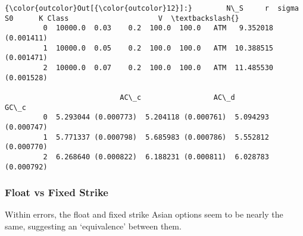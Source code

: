 \documentclass{article}
\begin{document}
            \begin{Verbatim}[commandchars=\\\{\}]
{\color{outcolor}Out[{\color{outcolor}12}]:}        N\_S     r  sigma     S0      K Class                     V  \textbackslash{}
         0  10000.0  0.03    0.2  100.0  100.0   ATM   9.352018 (0.001411)   
         1  10000.0  0.05    0.2  100.0  100.0   ATM  10.388515 (0.001471)   
         2  10000.0  0.07    0.2  100.0  100.0   ATM  11.485530 (0.001528)   
         
                           AC\_c                 AC\_d                 GC\_c  
         0  5.293044 (0.000773)  5.204118 (0.000761)  5.094293 (0.000747)  
         1  5.771337 (0.000798)  5.685983 (0.000786)  5.552812 (0.000770)  
         2  6.268640 (0.000822)  6.188231 (0.000811)  6.028783 (0.000792)  
\end{Verbatim}
        
    \subsubsection{Float vs Fixed Strike}\label{float-vs-fixed-strike}

Within errors, the float and fixed strike Asian options seem to be
nearly the same, suggesting an `equivalence' between them.
\end{document}
